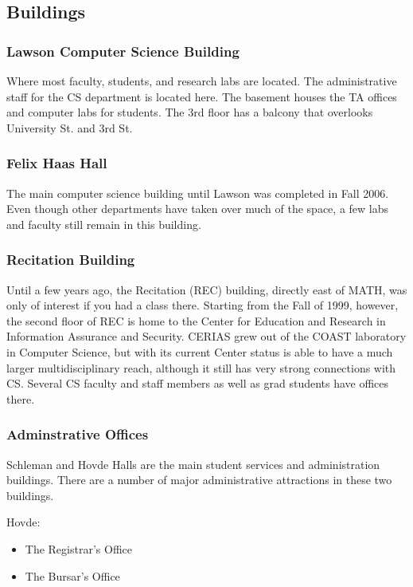 \subsection{Buildings}

\subsubsection{Lawson Computer Science Building}
Where most faculty, students, and research labs are located. The administrative staff for the CS department is located here. The basement houses the TA offices and computer labs for students. The 3rd floor has a balcony that overlooks University St. and 3rd St.



\subsubsection{Felix Haas Hall}
The main computer science building until Lawson was completed in Fall 2006. Even though other departments have taken over much of the space, a few labs and faculty still remain in this building.



\subsubsection{Recitation Building}
Until a few years ago, the Recitation (REC) building, directly east of MATH, was only of interest if you had a class there. Starting from the Fall of 1999, however, the second floor of REC is home to the Center for Education and Research in Information Assurance and Security. CERIAS grew out of the COAST laboratory in Computer Science, but with its current Center status is able to have a much larger multidisciplinary reach, although it still has very strong connections with CS. Several CS faculty and staff members as well as grad students have offices there.



\subsubsection{Adminstrative Offices}
Schleman and Hovde Halls are the main student services and administration buildings. There are a number of major administrative attractions in these two buildings.

Hovde:
\begin{itemize}
	\item The Registrar's Office
	\item The Bursar's Office
\end{itemize}

